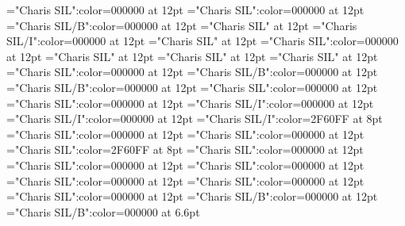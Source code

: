 \documentclass[a4paper]{article}
\begin{document}
\pagestyle{plain}
\sloppy
\setlength{\parfillskip}{0pt plus 1fil}
\font\xitemtpi="Charis SIL":color=000000 at 12pt
\font\xitembzhfonipa="Charis SIL":color=000000 at 12pt
\font\xitemxitemheadwordbefore="Charis SIL/B":color=000000 at 12pt
\font\xitemxitemexamplesbefore="Charis SIL" at 12pt
\font\xitemxitemexamplebefore="Charis SIL/I":color=000000 at 12pt
\font\xitemxitemslotsbefore="Charis SIL" at 12pt
\font\entrydicBody="Charis SIL":color=000000 at 12pt
\font{}="Charis SIL" at 12pt
\font{}="Charis SIL" at 12pt
\font{}="Charis SIL" at 12pt
\font\entryletDatadicBody="Charis SIL":color=000000 at 12pt
\font\headwordbzhentryletDatadicBody="Charis SIL/B":color=000000 at 12pt
\font\headwordafterentryletDatadicBody="Charis SIL/B":color=000000 at 12pt
\font\examplesentryletDatadicBody="Charis SIL":color=000000 at 12pt
\font\examplesafterentryletDatadicBody="Charis SIL":color=000000 at 12pt
\font\examplebzhexamplesentryletDatadicBody="Charis SIL/I":color=000000 at 12pt
\font\exampleafterexamplesentryletDatadicBody="Charis SIL/I":color=000000 at 12pt
\font\xlanguagetagenexamplebzhexamplesentryletDatadicBody="Charis SIL/I":color=2F60FF at 8pt
\font\translationsexamplesentryletDatadicBody="Charis SIL":color=000000 at 12pt
\font\translationentranslationsexamplesentryletDatadicBody="Charis SIL":color=000000 at 12pt
\font\xlanguagetagentranslationentranslationsexamplesentryletDatadicBody="Charis SIL":color=2F60FF at 8pt
\font\relationstranslationsexamplesentryletDatadicBody="Charis SIL":color=000000 at 12pt
\font\xitemrelationstranslationsexamplesentryletDatadicBody="Charis SIL":color=000000 at 12pt
\font\lexreftypeenxitemrelationstranslationsexamplesentryletDatadicBody="Charis SIL":color=000000 at 12pt
\font\lexreftargetsxitemrelationstranslationsexamplesentryletDatadicBody="Charis SIL":color=000000 at 12pt
\font\xitemlexreftargetsxitemrelationstranslationsexamplesentryletDatadicBody="Charis SIL":color=000000 at 12pt
\font\sensecrossrefbzhxitemlexreftargetsxitemrelationstranslationsexamplesentryletDatadicBody="Charis SIL":color=000000 at 12pt
\font\xsensenumberensensecrossrefbzhxitemlexreftargetsxitemrelationstranslationsexamplesentryletDatadicBody="Charis SIL/B":color=000000 at 12pt
\font\xhomographnumberbzhsensecrossrefbzhxitemlexreftargetsxitemrelationstranslationsexamplesentryletDatadicBody="Charis SIL/B":color=000000 at 6.6pt

\pagestyle{fancy} 
\end{document}
